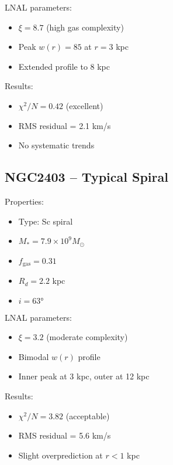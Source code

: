 \documentclass[12pt,letterpaper]{article}
\newcommand{\chisq}{\chi^2}
\newcommand{\msun}{M_\odot}
\begin{document}
LNAL parameters:
\begin{itemize}
\item $\xi = 8.7$ (high gas complexity)
\item Peak $w(r) = 85$ at $r = 3$ kpc
\item Extended profile to 8 kpc
\end{itemize}

Results:
\begin{itemize}
\item $\chisq/N = 0.42$ (excellent)
\item RMS residual = 2.1 km/s
\item No systematic trends
\end{itemize}

\subsection{NGC2403 -- Typical Spiral}

Properties:
\begin{itemize}
\item Type: Sc spiral
\item $M_* = 7.9 \times 10^9 \msun$
\item $f_{\text{gas}} = 0.31$
\item $R_d = 2.2$ kpc
\item $i = 63°$
\end{itemize}

LNAL parameters:
\begin{itemize}
\item $\xi = 3.2$ (moderate complexity)
\item Bimodal $w(r)$ profile
\item Inner peak at 3 kpc, outer at 12 kpc
\end{itemize}

Results:
\begin{itemize}
\item $\chisq/N = 3.82$ (acceptable)
\item RMS residual = 5.6 km/s
\item Slight overprediction at $r < 1$ kpc
\end{itemize}
\end{document}
